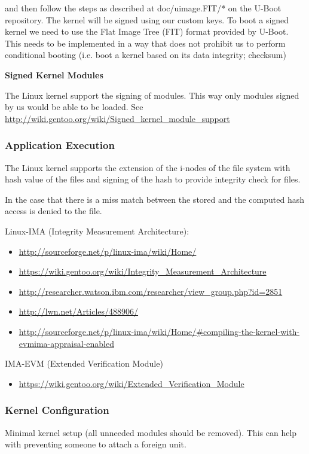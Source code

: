 and then follow the steps as described at doc/uimage.FIT/* on the U-Boot repository. The kernel will be signed using our custom keys. To boot a signed kernel we need to use the Flat Image Tree (FIT) format provided by U-Boot. This needs to be implemented in a way that does not prohibit us to perform conditional booting (i.e. boot a kernel based on its data integrity; checksum)

\noindent
\textbf{Signed Kernel Modules \tested{}}

The Linux kernel support the signing of modules. This way only modules signed by us would be able to be loaded. See \url{http://wiki.gentoo.org/wiki/Signed_kernel_module_support}



\subsubsection{Application Execution}
\tested{}


The Linux kernel supports the extension of the i-nodes of the file system with hash value of the files and signing of the hash to provide integrity check for files.

In the case that there is a miss match between the stored and the computed hash access is denied to the file.

Linux-IMA (Integrity Measurement Architecture):
\begin{itemize}
 \item \url{http://sourceforge.net/p/linux-ima/wiki/Home/}
 \item \url{https://wiki.gentoo.org/wiki/Integrity_Measurement_Architecture}
 \item \url{http://researcher.watson.ibm.com/researcher/view_group.php?id=2851}
 \item \url{http://lwn.net/Articles/488906/}
 \item \url{http://sourceforge.net/p/linux-ima/wiki/Home/#compiling-the-kernel-with-evmima-appraisal-enabled}
\end{itemize}


IMA-EVM (Extended Verification Module) 
\begin{itemize}
 \item \url{https://wiki.gentoo.org/wiki/Extended_Verification_Module}
\end{itemize}


\subsubsection{Kernel Configuration}
Minimal kernel setup (all unneeded modules should be removed). This can help with preventing someone to attach a foreign unit.

